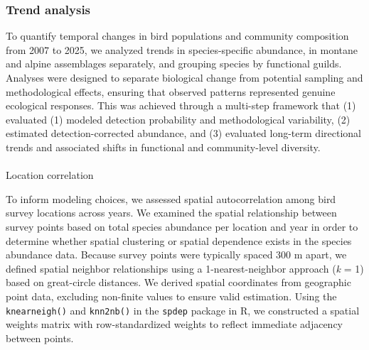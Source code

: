 \documentclass[
  letterpaper,
  DIV=11,
  numbers=noendperiod]{scrartcl}
\makeatletter
\let\oldparagraph\paragraph
\renewcommand{\paragraph}{
    \@ifstar
      \xxxParagraphStar
      \xxxParagraphNoStar
  }
\newcommand{\xxxParagraphStar}[1]{\oldparagraph*{#1}\mbox{}}
\newcommand{\xxxParagraphNoStar}[1]{\oldparagraph{#1}\mbox{}}
\newenvironment{Shaded}{\begin{snugshade}}{\end{snugshade}}
\newcommand{\AttributeTok}[1]{\textcolor[rgb]{0.40,0.45,0.13}{#1}}
\newcommand{\DecValTok}[1]{\textcolor[rgb]{0.68,0.00,0.00}{#1}}
\newcommand{\FunctionTok}[1]{\textcolor[rgb]{0.28,0.35,0.67}{#1}}
\newcommand{\NormalTok}[1]{\textcolor[rgb]{0.00,0.23,0.31}{#1}}
\newcommand{\OtherTok}[1]{\textcolor[rgb]{0.00,0.23,0.31}{#1}}
\newcommand{\SpecialCharTok}[1]{\textcolor[rgb]{0.37,0.37,0.37}{#1}}
\newcommand{\StringTok}[1]{\textcolor[rgb]{0.13,0.47,0.30}{#1}}
\makeatother
\begin{document}
\begin{Shaded}
\end{Shaded}

\subsubsection{Trend analysis}\label{trend-analysis}

To quantify temporal changes in bird populations and community
composition from 2007 to 2025, we analyzed trends in species-specific
abundance, in montane and alpine assemblages separately, and grouping
species by functional guilds. Analyses were designed to separate
biological change from potential sampling and methodological effects,
ensuring that observed patterns represented genuine ecological
responses. This was achieved through a multi-step framework that (1)
evaluated (1) modeled detection probability and methodological
variability, (2) estimated detection-corrected abundance, and (3)
evaluated long-term directional trends and associated shifts in
functional and community-level diversity.

\paragraph{Location correlation}\label{location-correlation}

To inform modeling choices, we assessed spatial autocorrelation among
bird survey locations across years. We examined the spatial relationship
between survey points based on total species abundance per location and
year in order to determine whether spatial clustering or spatial
dependence exists in the species abundance data. Because survey points
were typically spaced 300 m apart, we defined spatial neighbor
relationships using a 1-nearest-neighbor approach (\emph{k} = 1) based
on great-circle distances. We derived spatial coordinates from
geographic point data, excluding non-finite values to ensure valid
estimation. Using the \texttt{knearneigh()} and \texttt{knn2nb()} in the
\texttt{spdep} package in R, we constructed a spatial weights matrix
with row-standardized weights to reflect immediate adjacency between
points.
\end{document}
